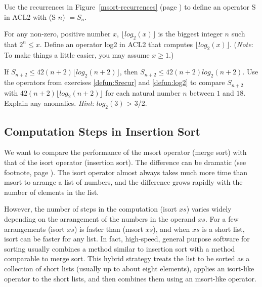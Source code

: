 \begin{ExerciseList}

\Exercise
\label{defun:Srecur}
Use the recurrences in Figure~\ref{msort-recurrences} (page \pageref{msort-recurrences})
to define an operator \textsf{S} in ACL2 with \textsf{(S $n$)} $= S_n$.

\Exercise
\label{defun:log2}
For any non-zero, positive number $x$, $\lfloor log_2(x)\rfloor$
is the biggest integer $n$ such that $2^n \leq x$.
Define an operator \textsf{log2} in ACL2 that computes $\lfloor log_2(x)\rfloor$.
(\emph{Note}: To make things a little easier, you may assume $x \geq 1$.)

\Exercise
If $S_{n+2} \leq 42(n+2)\lfloor log_2(n+2)\rfloor$, then
$S_{n+2} \leq 42(n+2) log_2(n+2)$.
Use the operators from exercises \ref{defun:Srecur} and \ref{defun:log2}
to compare $S_{n+2}$ with $42(n+2)\lfloor log_2(n+2)\rfloor$
for each natural number $n$ between $1$ and $18$. Explain any anomalies.
\emph{Hint}: $log_2(3)$ > 3/2.

\end{ExerciseList}

\subsection{Computation Steps in Insertion Sort}
\label{subsec:isort-steps}

We want to compare the performance of
the \textsf{msort} operator (merge sort)
with that of the \textsf{isort} operator (insertion sort).
The difference can be dramatic
(see footnote, page \pageref{bubble-vs-quicksort-example}).
The \textsf{isort} operator almost always
takes much more time than \textsf{msort}
to arrange a list of numbers,
and the difference grows rapidly with the number of elements in the list.

However, the number of steps in the computation \textsf{(isort $xs$)}
varies widely depending on the arrangement of the numbers in the operand $xs$.
For a few arrangements
\textsf{(isort $xs$)} is faster than \textsf{(msort $xs$)},
and when $xs$ is a short list, \textsf{isort} can be faster for any list.
In fact, high-speed, general purpose software for sorting
usually combines a method similar to insertion sort
with a method comparable to merge sort.
This hybrid strategy treats
the list to be sorted as a collection of short lists
(usually up to about eight elements),
applies an \textsf{isort}-like operator to the short lists,
and then combines them
using an \textsf{msort}-like operator.

